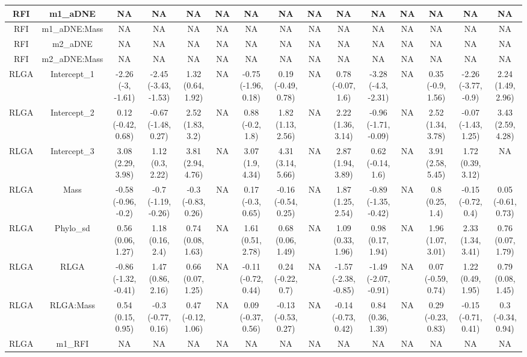 \begin{longtable}[t]{c|c|c|c|c|c|c|c|c|c|c|c|c|c|c}
\hline
RFI & m1_aDNE & NA & NA & NA & NA & NA & NA & NA & NA & NA & NA & NA & NA & NA\\
\hline
RFI & m1_aDNE:Mass & NA & NA & NA & NA & NA & NA & NA & NA & NA & NA & NA & NA & NA\\
\hline
RFI & m2_aDNE & NA & NA & NA & NA & NA & NA & NA & NA & NA & NA & NA & NA & NA\\
\hline
RFI & m2_aDNE:Mass & NA & NA & NA & NA & NA & NA & NA & NA & NA & NA & NA & NA & NA\\
\hline
RLGA & Intercept_1 & -2.26 (-3, -1.61) & -2.45 (-3.43, -1.53) & 1.32 (0.64, 1.92) & NA & -0.75 (-1.96, 0.18) & 0.19 (-0.49, 0.78) & NA & 0.78 (-0.07, 1.6) & -3.28 (-4.3, -2.31) & NA & 0.35 (-0.9, 1.56) & -2.26 (-3.77, -0.9) & 2.24 (1.49, 2.96)\\
\hline
RLGA & Intercept_2 & 0.12 (-0.42, 0.68) & -0.67 (-1.48, 0.27) & 2.52 (1.83, 3.2) & NA & 0.88 (-0.2, 1.8) & 1.82 (1.13, 2.56) & NA & 2.22 (1.36, 3.14) & -0.96 (-1.71, -0.09) & NA & 2.52 (1.34, 3.78) & -0.07 (-1.43, 1.25) & 3.43 (2.59, 4.28)\\
\hline
RLGA & Intercept_3 & 3.08 (2.29, 3.98) & 1.12 (0.3, 2.22) & 3.81 (2.94, 4.76) & NA & 3.07 (1.9, 4.34) & 4.31 (3.14, 5.66) & NA & 2.87 (1.94, 3.89) & 0.62 (-0.14, 1.6) & NA & 3.91 (2.58, 5.45) & 1.72 (0.39, 3.12) & NA\\
\hline
RLGA & Mass & -0.58 (-0.96, -0.2) & -0.7 (-1.19, -0.26) & -0.3 (-0.83, 0.26) & NA & 0.17 (-0.3, 0.65) & -0.16 (-0.54, 0.25) & NA & 1.87 (1.25, 2.54) & -0.89 (-1.35, -0.42) & NA & 0.8 (0.25, 1.4) & -0.15 (-0.72, 0.4) & 0.05 (-0.61, 0.73)\\
\hline
RLGA & Phylo_sd & 0.56 (0.06, 1.27) & 1.18 (0.16, 2.4) & 0.74 (0.08, 1.63) & NA & 1.61 (0.51, 2.78) & 0.68 (0.06, 1.49) & NA & 1.09 (0.33, 1.96) & 0.98 (0.17, 1.94) & NA & 1.96 (1.07, 3.01) & 2.33 (1.34, 3.41) & 0.76 (0.07, 1.79)\\
\hline
RLGA & RLGA & -0.86 (-1.32, -0.41) & 1.47 (0.86, 2.16) & 0.66 (0.07, 1.25) & NA & -0.11 (-0.72, 0.44) & 0.24 (-0.22, 0.7) & NA & -1.57 (-2.38, -0.85) & -1.49 (-2.07, -0.91) & NA & 0.07 (-0.59, 0.74) & 1.22 (0.49, 1.95) & 0.79 (0.08, 1.45)\\
\hline
RLGA & RLGA:Mass & 0.54 (0.15, 0.95) & -0.3 (-0.77, 0.16) & 0.47 (-0.12, 1.06) & NA & 0.09 (-0.37, 0.56) & -0.13 (-0.53, 0.27) & NA & -0.14 (-0.73, 0.42) & 0.84 (0.36, 1.39) & NA & 0.29 (-0.23, 0.83) & -0.15 (-0.71, 0.41) & 0.3 (-0.34, 0.94)\\
\hline
RLGA & m1_RFI & NA & NA & NA & NA & NA & NA & NA & NA & NA & NA & NA & NA & NA\\

\end{longtable}
